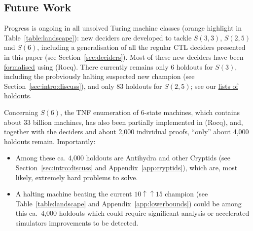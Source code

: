 \documentclass[a4paper,british]{article}
\theoremstyle{definition} %
\numberwithin{equation}{section}
\theoremstyle{definition} %
\begin{document}
















% 

\subsection{Future Work}

Progress is ongoing in all unsolved Turing machine classes (orange highlight in Table~\ref{table:landscape}): new deciders are developed to tackle $S(3,3)$, $S(2,5)$ and $S(6)$, including a generalisation of all the regular CTL deciders presented in this paper (see Section~\ref{sec:deciders}). Most of these new deciders have been  \href{https://github.com/ccz181078/busycoq/tree/BB6/verify}{formalised} using \Coq (Rocq). There currently remains only $6$ holdouts for $S(3)$, including the probviously halting suspected new champion (see Section~\ref{sec:intro:discuss}), and only $83$ holdouts for $S(2,5)$; see our \href{https://wiki.bbchallenge.org/wiki/Holdouts_lists}{lists of holdouts}.

Concerning $S(6)$, the TNF enumeration of 6-state machines, which contains about 33 billion machines, has also been partially implemented in \Coq (Rocq), and, together with the deciders and about 2,000 individual proofs, ``only'' about 4,000 holdouts remain. Importantly:
\begin{itemize}[label=--]
    \item Among these ca. 4,000 holdouts are Antihydra and other Cryptids (see Section~\ref{sec:intro:discuss} and Appendix~\ref{app:cryptids}), which are, most likely, extremely hard problems to solve.
    \item A halting machine beating the current $10\uparrow\uparrow15$ champion (see Table~\ref{table:landscape} and Appendix~\ref{app:lowerbounds}) could be among this ca.~4,000 holdouts which could require significant analysis or accelerated simulators improvements to be detected.
\end{itemize}
\end{document}
